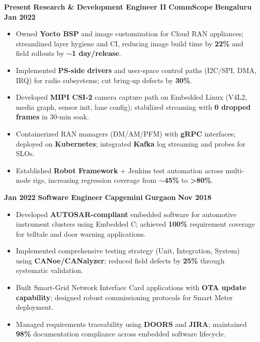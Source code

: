 \setlength{\parskip}{8pt plus 1pt minus 1pt}

\begin{experiences}
    \small
    \experience
        {\textbf{Present}}   %
        {\textbf{Research \& Development Engineer II}}  %
        {\textbf{CommScope}}  %
        {\textbf{Bengaluru}}  %
        {   %
            \textbf{Jan 2022}
        }
        {   %
            \begin{itemize}
                \item Owned \textbf{Yocto BSP} and image customization for Cloud RAN appliances; streamlined layer hygiene and CI, reducing image build time by \textbf{22\%} and field rollouts by \textbf{$\sim$1 day/release}.
                \item Implemented \textbf{PS-side drivers} and user-space control paths (I2C/SPI, DMA, IRQ) for radio subsystems; cut bring-up defects by \textbf{30\%}.
                \item Developed \textbf{MIPI CSI-2} camera capture path on Embedded Linux (V4L2, media graph, sensor init, lane config); stabilized streaming with \textbf{0 dropped frames} in 30-min soak.
                \item Containerized RAN managers (DM/AM/PFM) with \textbf{gRPC} interfaces; deployed on \textbf{Kubernetes}; integrated \textbf{Kafka} log streaming and probes for SLOs.
                \item Established \textbf{Robot Framework} + Jenkins test automation across multi-node rigs, increasing regression coverage from \textbf{$\sim$45\%} to \textbf{>80\%}.
            \end{itemize}
        }
        {}
    \experience
        {\textbf{Jan 2022}}   %
        {\textbf{Software Engineer}}  %
        {\textbf{Capgemini}}  %
        {\textbf{Gurgaon}}  %
        {   %
            \textbf{Nov 2018}
        }
        {   %
            \begin{itemize}
                \item Developed \textbf{AUTOSAR-compliant} embedded software for automotive instrument clusters using Embedded C; achieved \textbf{100\%} requirement coverage for telltale and door warning applications.
                \item Implemented comprehensive testing strategy (Unit, Integration, System) using \textbf{CANoe/CANalyzer}; reduced field defects by \textbf{25\%} through systematic validation.
                \item Built Smart-Grid Network Interface Card applications with \textbf{OTA update capability}; designed robust commissioning protocols for Smart Meter deployment.
                \item Managed requirements traceability using \textbf{DOORS} and \textbf{JIRA}; maintained \textbf{98\%} documentation compliance across embedded software lifecycle.
            \end{itemize}
        }
        {}       
        

\end{experiences}
